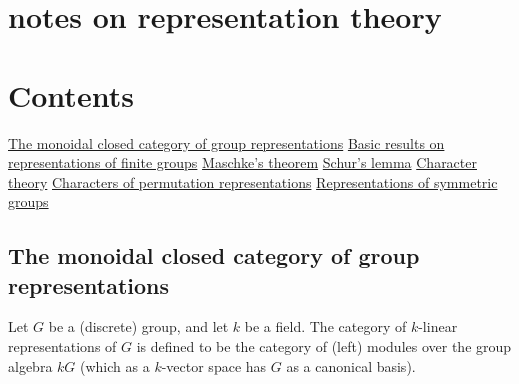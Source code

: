\documentclass[12pt,titlepage]{article}
\theoremstyle{plain}
\theoremstyle{definition}
\theoremstyle{remark}
\begin{document}


\section*{notes on representation theory}

\hypertarget{contents}{}\section*{{Contents}}\label{contents}

\noindent\hyperlink{the_monoidal_closed_category_of_group_representations}{The monoidal closed category of group representations}\dotfill \pageref*{the_monoidal_closed_category_of_group_representations} \linebreak
\noindent\hyperlink{basic_results_on_representations_of_finite_groups}{Basic results on representations of finite groups}\dotfill \pageref*{basic_results_on_representations_of_finite_groups} \linebreak
\noindent\hyperlink{maschkes_theorem}{Maschke's theorem}\dotfill \pageref*{maschkes_theorem} \linebreak
\noindent\hyperlink{schurs_lemma}{Schur's lemma}\dotfill \pageref*{schurs_lemma} \linebreak
\noindent\hyperlink{character_theory}{Character theory}\dotfill \pageref*{character_theory} \linebreak
\noindent\hyperlink{characters_of_permutation_representations}{Characters of permutation representations}\dotfill \pageref*{characters_of_permutation_representations} \linebreak
\noindent\hyperlink{representations_of_symmetric_groups}{Representations of symmetric groups}\dotfill \pageref*{representations_of_symmetric_groups} \linebreak


\hypertarget{the_monoidal_closed_category_of_group_representations}{}\subsection*{{The monoidal closed category of group representations}}\label{the_monoidal_closed_category_of_group_representations}

Let $G$ be a (discrete) group, and let $k$ be a field. The category of $k$-linear representations of $G$ is defined to be the category of (left) modules over the group algebra $k G$ (which as a $k$-vector space has $G$ as a canonical basis).
\end{document}
